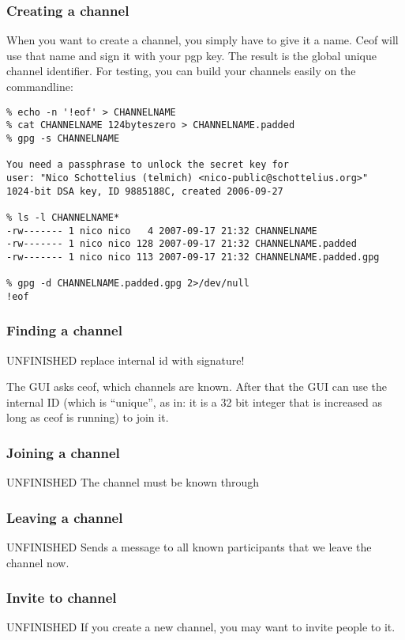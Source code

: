 \documentclass[12pt,a4paper]{book}
\begin{document}
\subsubsection{Creating a channel}
When you want to create a channel, you simply have to give it a name.
Ceof will use that name and sign it with your pgp key. The result is the
global unique channel identifier. For testing, you can build your channels
easily on the commandline:
\begin{verbatim}
% echo -n '!eof' > CHANNELNAME
% cat CHANNELNAME 124byteszero > CHANNELNAME.padded
% gpg -s CHANNELNAME 

You need a passphrase to unlock the secret key for
user: "Nico Schottelius (telmich) <nico-public@schottelius.org>"
1024-bit DSA key, ID 9885188C, created 2006-09-27

% ls -l CHANNELNAME*
-rw------- 1 nico nico   4 2007-09-17 21:32 CHANNELNAME
-rw------- 1 nico nico 128 2007-09-17 21:32 CHANNELNAME.padded
-rw------- 1 nico nico 113 2007-09-17 21:32 CHANNELNAME.padded.gpg

% gpg -d CHANNELNAME.padded.gpg 2>/dev/null
!eof
\end{verbatim}
\subsubsection{Finding a channel}
UNFINISHED
replace internal id with signature!

The GUI asks ceof, which channels are known. After that the GUI
can use the internal ID (which is "`unique"', as in: it is a 32 bit integer
that is increased as long as ceof is running) to join it.
\subsubsection{Joining a channel}
UNFINISHED
The channel must be known through 
\subsubsection{Leaving a channel}
UNFINISHED
Sends a message to all known participants that we leave the channel now.
\subsubsection{Invite to channel}
UNFINISHED
If you create a new channel, you may want to invite people to it.
\end{document}
